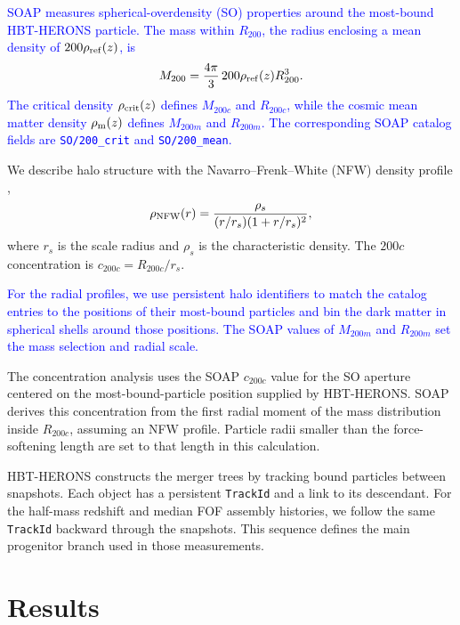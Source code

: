 \documentclass[
 reprint,
 superscriptaddress,
 nofootinbib,
 nobibnotes,
 amsmath,
 amssymb,
 aps,
 prd,
 floatfix,
 longbibliography
]{revtex4-2}
\DeclareRobustCommand{\change}[1]{\textcolor{blue}{#1}}
\newcommand\Tk[1]{{\color{red} \bf #1}}
\begin{document}
\change{\textsc{SOAP} \citep{McGibbon2025SOAP} measures spherical-overdensity (SO) properties around the most-bound \textsc{HBT-HERONS} particle. The mass within \(R_{200}\), the radius enclosing a mean density of \(200\rho_{\rm ref}(z)\), is}
\begin{equation}
M_{200}=\frac{4\pi}{3}\,200\rho_{\rm ref}(z)R_{200}^3.
\end{equation}
\change{The critical density \(\rho_{\rm crit}(z)\) defines \(M_{200c}\) and \(R_{200c}\), while the cosmic mean matter density \(\rho_{\rm m}(z)\) defines \(M_{200m}\) and \(R_{200m}\). The corresponding \textsc{SOAP} catalog fields are \texttt{SO/200\_crit} and \texttt{SO/200\_mean}.}

We describe halo structure with the Navarro--Frenk--White (NFW) density profile \citep{Navarro1996NFW,Navarro1997NFW},
\begin{equation}
\label{eq:nfw_profile}
\rho_{\rm NFW}(r)=
\frac{\rho_s}{(r/r_s)(1+r/r_s)^2},
\end{equation}
where \(r_s\) is the scale radius and \(\rho_s\) is the characteristic density. The \(200c\) concentration is \(c_{200c}=R_{200c}/r_s\).

\change{For the radial profiles, we use persistent halo identifiers to match the catalog entries to the positions of their most-bound particles and bin the dark matter in spherical shells around those positions. The \textsc{SOAP} values of \(M_{200m}\) and \(R_{200m}\) set the mass selection and radial scale.}

The concentration analysis uses the \textsc{SOAP} \(c_{200c}\) value for the SO aperture centered on the most-bound-particle position supplied by \textsc{HBT-HERONS}. \textsc{SOAP} derives this concentration from the first radial moment of the mass distribution inside \(R_{200c}\), assuming an NFW profile. Particle radii smaller than the force-softening length are set to that length in this calculation.


\textsc{HBT-HERONS} constructs the merger trees by tracking bound particles between snapshots. Each object has a persistent \texttt{TrackId} and a link to its descendant. For the half-mass redshift and median FOF assembly histories, we follow the same \texttt{TrackId} backward through the snapshots. This sequence defines the main progenitor branch used in those measurements.


\section{Results}
\label{sec:results}
\end{document}
